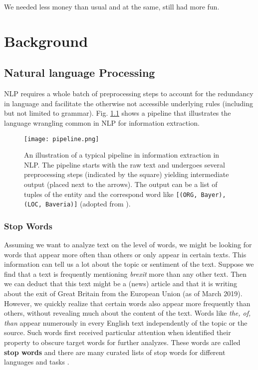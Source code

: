 We needed less money than usual and at the same, still had more fun.\chapter{Background}


\section{Natural language Processing}
NLP requires a whole batch of preprocessing steps to account for the redundancy in language and facilitate the otherwise not accessible underlying rules (including but not limited to grammar). Fig. \ref{fig:pipeline} shows a pipeline that illustrates the language wrangling common in NLP for information extraction.

\begin{figure}[h!]
    \centering
    \texttt{[image: pipeline.png]}
    \caption{An illustration of a typical pipeline in information extraction in NLP. The pipeline starts with the raw text and undergoes several preprocessing steps (indicated by the square) yielding intermediate output (placed next to the arrows). The output can be a list of tuples of the entity and the correspond word like \texttt{[(ORG, \textquotesingle Bayer\textquotesingle), (LOC, \textquotesingle Baveria\textquotesingle)]} (adopted from \citep{Bird2009}).}
    \label{fig:pipeline}
\end{figure}

\subsection{Stop Words}
Assuming we want to analyze text on the level of words, we might be looking for
words that appear more often than others or only appear in certain texts.
This information can tell us a lot about the topic or sentiment of the text.
Suppose we find that a text is frequently mentioning \textit{brexit} more than any other text.
Then we can deduct that this text might be a (news) article and that it is writing about the exit of Great Britain from the European Union (as of March 2019).
However, we quickly realize that certain words also appear more frequently than others, without revealing much about the content of the text.
Words like \textit{the, of, than} appear numerously in every English text independently of the topic or the source.
Such words first received particular attention when \cite{Luhn1960}  identified their property to obscure target words for further analyzes.
These words are called \textbf{stop words} and there are many curated lists of stop words for different languages and tasks \citep{RANKS2019}.


